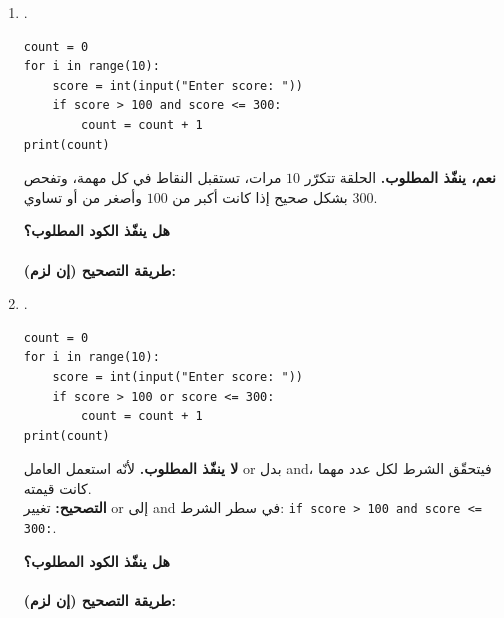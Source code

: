 \documentclass[14pt]{extarticle}
\begin{document}
\begin{enumerate}[label=\textbf{السؤال \arabic*:}, wide=0pt, itemsep=2.2em]
\begin{enumerate}[label=\textbf{مقطع \alph*:}, wide=0pt, itemsep=1.5em]

\item .
\begin{boxCode}
\begin{english}
\begin{verbatim}
count = 0
for i in range(10):
    score = int(input("Enter score: "))
    if score > 100 and score <= 300:
        count = count + 1
print(count)
\end{verbatim}
\end{english}
\end{boxCode}
\ifwithsols
\begin{boxSolution}
\textbf{نعم، ينفّذ المطلوب.} الحلقة تتكرّر $10$ مرات، تستقبل النقاط في كل مهمة، وتفحص بشكل صحيح إذا كانت أكبر من $100$ وأصغر من أو تساوي $300$.
\end{boxSolution}
\else
\vspace{0.5cm}
\textbf{هل ينفّذ الكود المطلوب؟} \hrulefill \\
 \\
\textbf{طريقة التصحيح (إن لزم):} \hrulefill
\fi
\filbreak

\item .
\begin{boxCode}
\begin{english}
\begin{verbatim}
count = 0
for i in range(10):
    score = int(input("Enter score: "))
    if score > 100 or score <= 300:
        count = count + 1
print(count)
\end{verbatim}
\end{english}
\end{boxCode}
\ifwithsols
\begin{boxSolution}
\textbf{لا ينفّذ المطلوب.} لأنّه استعمل العامل \textenglish{or} بدل \textenglish{and}، فيتحقّق الشرط لكل عدد مهما كانت قيمته. \\
\textbf{التصحيح:} تغيير \textenglish{or} إلى \textenglish{and} في سطر الشرط: \textenglish{\texttt{if score > 100 and score <= 300:}}.
\end{boxSolution}
\else
\vspace{0.5cm}
\textbf{هل ينفّذ الكود المطلوب؟} \hrulefill \\
 \\
\textbf{طريقة التصحيح (إن لزم):} \hrulefill
\fi
\filbreak


\end{enumerate}
\end{enumerate}
\end{document}
